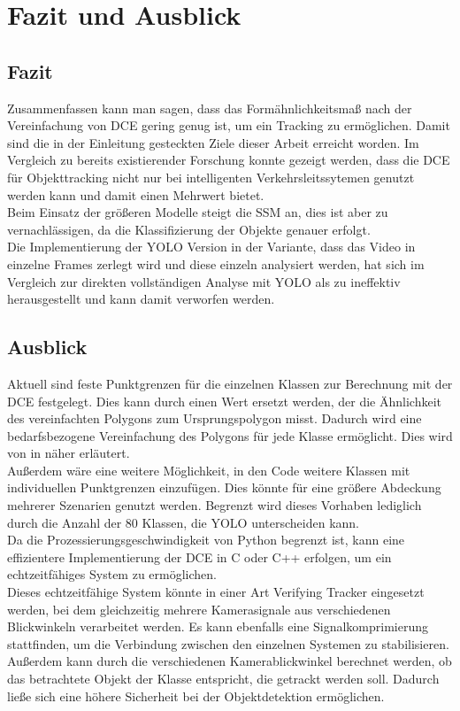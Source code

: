 \chapter{Fazit und Ausblick}
\label{ch:conclusion}
\section{Fazit}
{ 
    Zusammenfassen kann man sagen, dass das Formähnlichkeitsmaß nach der Vereinfachung von DCE gering genug ist, um ein Tracking zu ermöglichen. Damit sind die in der Einleitung gesteckten Ziele dieser Arbeit erreicht worden. Im Vergleich zu bereits existierender Forschung konnte gezeigt werden, dass die DCE für Objekttracking nicht nur bei intelligenten Verkehrsleitssytemen genutzt werden kann und damit einen Mehrwert bietet. \\
	Beim Einsatz der größeren Modelle steigt die SSM an, dies ist aber zu vernachlässigen, da die Klassifizierung der Objekte genauer erfolgt.  \\
	Die Implementierung der YOLO Version in der Variante, dass das Video in einzelne Frames zerlegt wird und diese einzeln analysiert werden, hat sich im Vergleich zur direkten vollständigen Analyse mit YOLO als zu ineffektiv herausgestellt und kann damit verworfen werden.

    }
\section{Ausblick}
{
	Aktuell sind feste Punktgrenzen für die einzelnen Klassen zur Berechnung mit der DCE festgelegt. Dies kann durch einen Wert ersetzt werden, der die Ähnlichkeit des vereinfachten Polygons zum Ursprungspolygon misst. Dadurch wird eine bedarfsbezogene Vereinfachung des Polygons für jede Klasse ermöglicht. Dies wird von \citeauthor{Latecki2003} in  \citep{Latecki2003} näher erläutert. \\
	Außerdem wäre eine weitere Möglichkeit, in den Code weitere Klassen mit individuellen Punktgrenzen einzufügen. Dies könnte für eine größere Abdeckung mehrerer Szenarien genutzt werden. Begrenzt wird dieses Vorhaben lediglich durch die Anzahl der 80 Klassen, die YOLO unterscheiden kann. \\
	Da die Prozessierungsgeschwindigkeit von Python begrenzt ist, kann eine effizientere Implementierung der DCE in C oder C++ erfolgen, um ein echtzeitfähiges System zu ermöglichen. \\
	Dieses echtzeitfähige System könnte in einer Art \glqq Verifying Tracker\grqq{} eingesetzt werden, bei dem gleichzeitig mehrere Kamerasignale aus verschiedenen Blickwinkeln verarbeitet werden. Es kann ebenfalls eine Signalkomprimierung stattfinden, um die Verbindung zwischen den einzelnen Systemen zu stabilisieren.  Außerdem kann durch die verschiedenen Kamerablickwinkel berechnet werden, ob das betrachtete Objekt der Klasse entspricht, die getrackt werden soll. Dadurch ließe sich eine höhere Sicherheit bei der Objektdetektion ermöglichen. 

}

